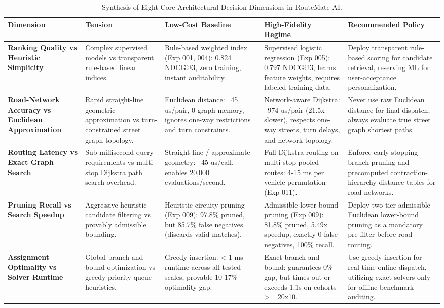 \begin{table}[t]
\centering
\small
\caption{Synthesis of Eight Core Architectural Decision Dimensions in RouteMate AI.}
\label{tab:tradeoff_synthesis}
\begin{tabularx}{\textwidth}{l p{3.2cm} p{3.2cm} p{3.2cm} p{3.8cm}}
\toprule
\textbf{Dimension} & \textbf{Tension} & \textbf{Low-Cost Baseline} & \textbf{High-Fidelity Regime} & \textbf{Recommended Policy} \\
\midrule
\textbf{Ranking Quality vs Heuristic Simplicity} & Complex supervised models vs transparent rule-based linear indices. & Rule-based weighted index (Exp 001, 004): 0.824 NDCG@3, zero training, instant auditability. & Supervised logistic regression (Exp 005): 0.797 NDCG@3, learns feature weights, requires labeled training data. & Deploy transparent rule-based scoring for candidate retrieval, reserving ML for user-acceptance personalization. \\
\textbf{Road-Network Accuracy vs Euclidean Approximation} & Rapid straight-line geometric approximation vs turn-constrained street graph topology. & Euclidean distance: ~45 us/pair, 0 graph memory, ignores one-way restrictions and turn constraints. & Network-aware Dijkstra: ~974 us/pair (21.5x slower), respects one-way streets, turn delays, and network topology. & Never use raw Euclidean distance for final dispatch; always evaluate true street graph shortest paths. \\
\textbf{Routing Latency vs Exact Graph Search} & Sub-millisecond query requirements vs multi-stop Dijkstra path search overhead. & Straight-line / approximate geometry: ~45 us/call, enables 20,000 evaluations/second. & Full Dijkstra routing on multi-stop pooled routes: 4-15 ms per vehicle permutation (Exp 011). & Enforce early-stopping branch pruning and precomputed contraction-hierarchy distance tables for road networks. \\
\textbf{Pruning Recall vs Search Speedup} & Aggressive heuristic candidate filtering vs provably admissible bounding. & Heuristic circuity pruning (Exp 009): 97.8\% pruned, but 85.7\% false negatives (discards valid matches). & Admissible lower-bound pruning (Exp 009): 81.8\% pruned, 5.49x speedup, exactly 0 false negatives, 100\% recall. & Deploy two-tier admissible Euclidean lower-bound pruning as a mandatory pre-filter before road routing. \\
\textbf{Assignment Optimality vs Solver Runtime} & Global branch-and-bound optimization vs greedy priority queue heuristics. & Greedy insertion: < 1 ms runtime across all tested scales, provable 10-17\% optimality gap. & Exact branch-and-bound: guarantees 0\% gap, but times out or exceeds 1.1s on cohorts >= 20x10. & Use greedy insertion for real-time online dispatch, utilizing exact solvers only for offline benchmark auditing. \\

\end{tabularx}
\end{table}
